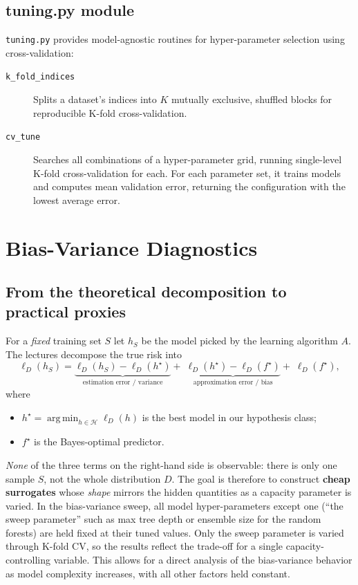 \documentclass[12pt]{report}
\begin{document}
\subsection{tuning.py module}
\texttt{tuning.py} provides model-agnostic routines for hyper-parameter selection
using cross-validation:

\begin{description}
  \item[\texttt{k\_fold\_indices}]
        Splits a dataset's indices into $K$ mutually exclusive, shuffled blocks for
        reproducible K-fold cross-validation.

  \item[\texttt{cv\_tune}]
        Searches all combinations of a hyper-parameter grid, running single-level
        K-fold cross-validation for each. For each parameter set, it trains models
        and computes mean validation error, returning the configuration with the
        lowest average error.
\end{description}

\section{Bias-Variance Diagnostics}

\subsection{From the theoretical decomposition to practical proxies}

For a \emph{fixed} training set $S$ let $h_S$ be the model picked by the learning
algorithm $A$.  The lectures decompose the true risk into
\[
  \ell_D(h_S)=
  \underbrace{\ell_D(h_S)-\ell_D(h^\star)}_{\text{estimation error / variance}}
  +\;\underbrace{\ell_D(h^\star)-\ell_D(f^\star)}_{\text{approximation error / bias}}
  +\;\ell_D(f^\star),
\]
where
\begin{itemize}
  \item $h^\star=
        \operatorname*{arg\,min}_{h\in\mathcal H}\ell_D(h)$ is the best model
        in our hypothesis class;
  \item $f^\star$ is the Bayes-optimal predictor.
\end{itemize}

\emph{None} of the three terms on the right-hand side is observable: there is only one 
sample $S$, not the whole distribution $D$. The goal is therefore to construct 
\textbf{cheap surrogates} whose \emph{shape} mirrors the hidden quantities as a capacity 
parameter is varied.
In the bias-variance sweep, all model hyper-parameters except one 
(“the sweep parameter” such as max tree depth or ensemble size for the random forests) 
are held fixed at their tuned values. Only the sweep parameter is varied through 
K-fold CV, so the results reflect the trade-off for a single capacity-controlling 
variable. This allows for a direct analysis of the bias-variance behavior as model 
complexity increases, with all other factors held constant.
\end{document}
